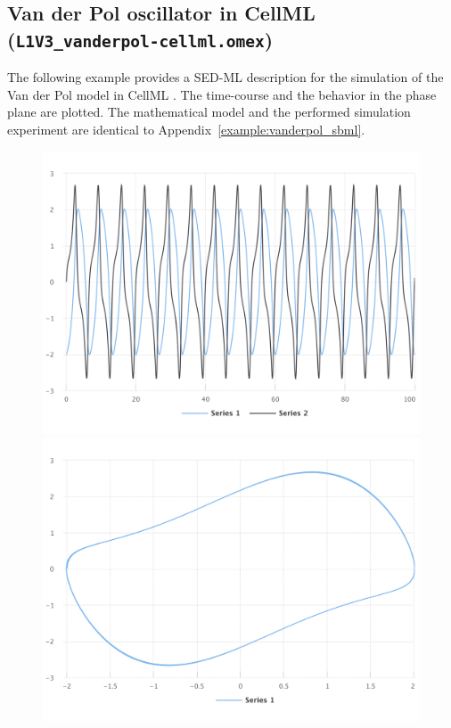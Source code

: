 \subsection{Van der Pol oscillator in CellML (\texttt{L1V3\_vanderpol-cellml.omex})}
\label{example:vanderpol_cellml}
The following example provides a SED-ML description for the simulation of the Van der Pol model in CellML \citep{cuellar:2003}. The time-course and the behavior in the phase plane are plotted. The mathematical model and the performed simulation experiment are identical to Appendix~\ref{example:vanderpol_sbml}.

\begin{figure}[ht]
    \centering
    \begin{minipage}{0.47\textwidth}
        \centering
        \includegraphics[width=1.0\textwidth]{examples/vanderpol-cellml/results/sedml_webtools/plot1}
        \includegraphics[width=1.0\textwidth]{examples/vanderpol-cellml/results/sedml_webtools/plot2}

\end{minipage}
\end{figure}
